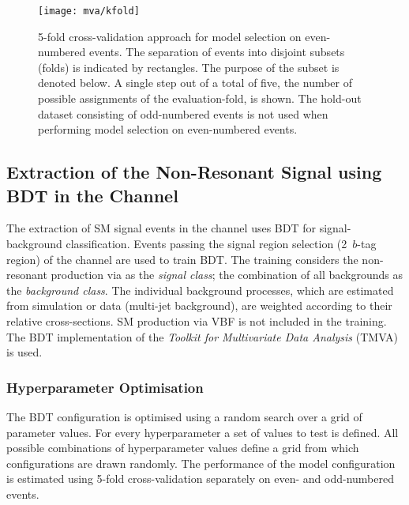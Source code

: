 \begin{figure}[htbp]
  \centering

  \texttt{[image: mva/kfold]}

  \caption{5-fold cross-validation approach for model selection on
    even-numbered events. The separation of events into disjoint
    subsets (folds) is indicated by rectangles. The purpose of the
    subset is denoted below. A single step out of a total of five, the
    number of possible assignments of the evaluation-fold, is
    shown. The hold-out dataset consisting of odd-numbered events is
    not used when performing model selection on even-numbered events.}%
  \label{fig:cross_validation}
\end{figure}



\subsection{Extraction of the Non-Resonant \HH Signal using BDT in the
  \hadhad Channel}%
\label{sec:mva_smbdt}

The extraction of SM \HH signal events in the \hadhad channel uses BDT
for signal-background classification. Events passing the signal region
selection (2~$b$-tag region) of the \hadhad channel are used to train
BDT. The training considers the non-resonant \HH production via \ggF
as the \emph{signal class}; the combination of all backgrounds as the
\emph{background class}. The individual background processes, which
are estimated from simulation or data (multi-jet background), are
weighted according to their relative cross-sections. SM \HH production
via VBF is not included in the training.
The BDT implementation of the \emph{Toolkit for Multivariate Data
  Analysis} (TMVA)~\cite{Hocker:2007ht} is used.


\subsubsection{Hyperparameter Optimisation}

The BDT configuration is optimised using a random search over a grid
of parameter values. For every hyperparameter a set of values to test
is defined. All possible combinations of hyperparameter values define
a grid from which configurations are drawn randomly. The performance
of the model configuration is estimated using 5-fold cross-validation
separately on even- and odd-numbered events.


